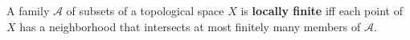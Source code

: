 A family $\mathcal{A}$ of subsets of a topological space $X$ is \textbf{locally finite} iff each point of $X$ has a neighborhood that intersects at most finitely many members of $\mathcal{A}$.

